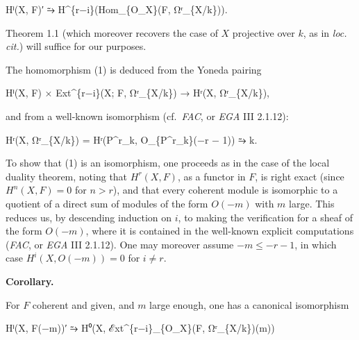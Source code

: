 \documentclass[
]{article}
\newenvironment{Shaded}{}{}
\newcommand{\NormalTok}[1]{#1}
\begin{document}
\begin{Shaded}
\begin{Highlighting}[]
\NormalTok{Hⁱ(X, F)′ ⥲ H\^{}\{r−i\}(Hom\_\{O\_X\}(F, Ωʳ\_\{X/k\})).}
\end{Highlighting}
\end{Shaded}

Theorem 1.1 (which moreover recovers the case of \(X\) projective over
\(k\), as in \emph{loc. cit.}) will suffice for our purposes.

The homomorphism (1) is deduced from the Yoneda pairing

\begin{Shaded}
\begin{Highlighting}[]
\NormalTok{Hⁱ(X, F) × Ext\^{}\{r−i\}(X; F, Ωʳ\_\{X/k\}) → Hʳ(X, Ωʳ\_\{X/k\}),}
\end{Highlighting}
\end{Shaded}

and from a well-known isomorphism (cf.~\emph{FAC}, or \emph{EGA} III
2.1.12):

\begin{Shaded}
\begin{Highlighting}[]
\NormalTok{Hʳ(X, Ωʳ\_\{X/k\}) = Hʳ(P\^{}r\_k, O\_\{P\^{}r\_k\}(−r − 1)) ⥲ k.}
\end{Highlighting}
\end{Shaded}

To show that (1) is an isomorphism, one proceeds as in the case of the
local duality theorem, noting that \(H^{r}(X, F)\), as a functor in
\(F\), is right exact (since \(H^{n}(X, F) = 0\) for \(n > r\)), and
that every coherent module is isomorphic to a quotient of a direct sum
of modules of the form \(O(-m)\) with \(m\) large. This reduces us, by
descending induction on \(i\), to making the verification for a sheaf of
the form \(O(-m)\), where it is contained in the well-known explicit
computations (\emph{FAC}, or \emph{EGA} III 2.1.12). One may moreover
assume \(-m \leqslant -r - 1\), in which case \(H^{i}(X, O(-m)) = 0\)
for \(i \neq r\).

\textbf{Corollary.}

For \(F\) coherent and given, and \(m\) large enough, one has a
canonical isomorphism

\begin{Shaded}
\begin{Highlighting}[]
\NormalTok{Hⁱ(X, F(−m))′ ⥲ H⁰(X, ℰxt\^{}\{r−i\}\_\{O\_X\}(F, Ωʳ\_\{X/k\})(m))}
\end{Highlighting}
\end{Shaded}
\end{document}
